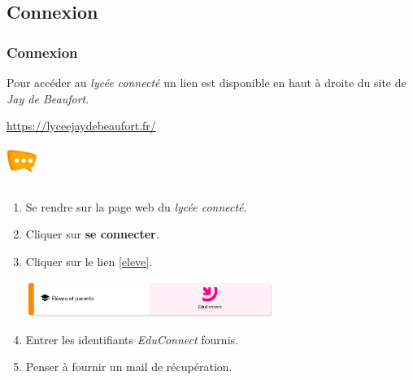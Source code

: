 \documentclass[svgnames,11pt]{beamer}
\begin{document}
\subsection{Connexion}
\begin{frame}
    \frametitle{Connexion}

    Pour accéder au \emph{lycée connecté} un lien est disponible en haut à droite du site de \emph{Jay de Beaufort}.
\begin{center}
    {\Large         \url{https://lyceejaydebeaufort.fr/}
    }
\end{center}
\begin{center}
    \includegraphics[width=1cm]{ressources/ent.jpg}
\end{center}

\end{frame}
\begin{frame}
    \frametitle{}

    \begin{activite}
    \begin{enumerate}
        \item Se rendre sur la page web du \emph{lycée connecté}.
        \item Cliquer sur \textbf{se connecter}.
        \item Cliquer sur le lien \ref{eleve}.
        \begin{center}
        \centering
        \includegraphics[width=8cm]{ressources/educonnect2021.png}
        \label{eleve}
        \end{center}
        \item Entrer les identifiants \emph{EduConnect} fournis.
        \item Penser à fournir un mail de récupération.
    \end{enumerate}
    \end{activite}

\end{frame}
\end{document}
